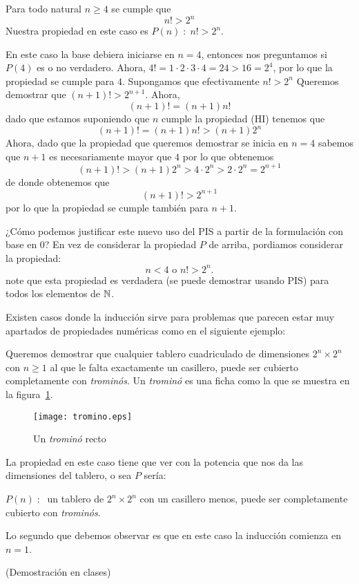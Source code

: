 \begin{ejemplo}
Para todo natural $n\geq 4$ se cumple que 
\[
n!>2^n
\]
Nuestra propiedad en este caso es $P(n)\;:\;n!>2^n$.

\begin{demostracion}
\begin{inducciondemo}
\BI En este caso la base debiera iniciarse en $n=4$, entonces nos preguntamos si $P(4)$ es o no verdadero.
Ahora, $4!=1\cdot 2\cdot 3\cdot 4=24>16=2^4$, por lo que la propiedad se cumple para $4$.
\HI Supongamos que efectivamente $n!>2^n$
\TI Queremos demostrar que $(n+1)!>2^{n+1}$.
Ahora, 
\[
(n+1)!=(n+1)n!
\]
dado que estamos suponiendo que $n$ cumple la propiedad (HI) tenemos que
\[
(n+1)!=(n+1)n!>(n+1)2^n
\]
Ahora, dado que la propiedad que queremos demostrar se inicia en $n=4$ sabemos que $n+1$ es necesariamente mayor que $4$ por lo que obtenemos
\[
(n+1)!>(n+1)2^n>4\cdot 2^n>2\cdot 2^n=2^{n+1}
\]
de donde obtenemos que
\[
(n+1)!>2^{n+1}
\]
por lo que la propiedad se cumple también para $n+1$.
\end{inducciondemo}
\end{demostracion}
\end{ejemplo}

¿Cómo podemos justificar este nuevo uso del PIS a partir de la formulación con base en 0?
En vez de considerar la propiedad $P$ de arriba, pordiamos considerar la propiedad:
\[
n<4 \text{ o }n!>2^n.
\]
note que esta propiedad es verdadera (se puede demostrar usando PIS) para todos los elementos de $\mathbb{N}$.

Existen casos donde la inducción sirve para problemas que parecen estar muy apartados de propiedades numéricas como en el siguiente ejemplo:

\begin{ejemplo}
Queremos demostrar que cualquier tablero cuadriculado de dimensiones $2^n\times 2^n$ con $n\geq 1$ al que le falta exactamente un casillero, puede ser cubierto completamente con \emph{trominós}.
Un \emph{trominó} es una ficha como la que se muestra en la figura~\ref{fig:tromino}.

\begin{figure}[h!]
\begin{center}
\texttt{[image: tromino.eps]}
\end{center}
\caption{Un \emph{trominó} recto}
\label{fig:tromino}
\end{figure}

La propiedad en este caso tiene que ver con la potencia que nos da las dimensiones del tablero, o sea $P$ sería:
\begin{center}
$P(n)\;:\;$ un tablero de $2^n\times 2^n$ con un casillero menos, puede ser completamente cubierto con \emph{trominós}.
\end{center}
Lo segundo que debemos observar es que en este caso la inducción comienza en $n=1$.

\begin{demostracion}
(Demostración en clases)
\end{demostracion}
\end{ejemplo}

